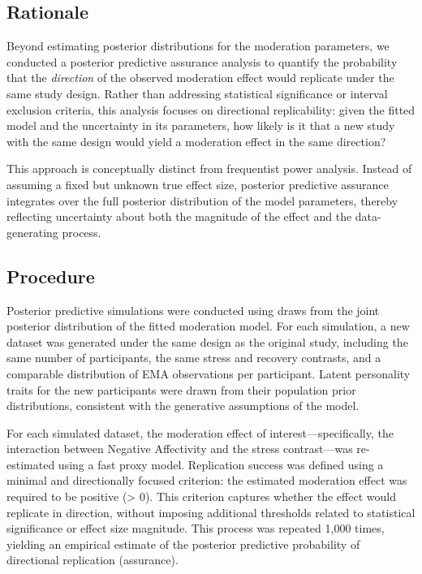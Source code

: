 \documentclass[
  english,
  man,floatsintext]{apa6}
\begin{document}
\subsection{Rationale}\label{rationale}

Beyond estimating posterior distributions for the moderation parameters, we conducted a posterior predictive assurance analysis to quantify the probability that the \emph{direction} of the observed moderation effect would replicate under the same study design. Rather than addressing statistical significance or interval exclusion criteria, this analysis focuses on directional replicability: given the fitted model and the uncertainty in its parameters, how likely is it that a new study with the same design would yield a moderation effect in the same direction?

This approach is conceptually distinct from frequentist power analysis. Instead of assuming a fixed but unknown true effect size, posterior predictive assurance integrates over the full posterior distribution of the model parameters, thereby reflecting uncertainty about both the magnitude of the effect and the data-generating process.

\subsection{Procedure}\label{procedure}

Posterior predictive simulations were conducted using draws from the joint posterior distribution of the fitted moderation model. For each simulation, a new dataset was generated under the same design as the original study, including the same number of participants, the same stress and recovery contrasts, and a comparable distribution of EMA observations per participant. Latent personality traits for the new participants were drawn from their population prior distributions, consistent with the generative assumptions of the model.

For each simulated dataset, the moderation effect of interest---specifically, the interaction between Negative Affectivity and the stress contrast---was re-estimated using a fast proxy model. Replication success was defined using a minimal and directionally focused criterion: the estimated moderation effect was required to be positive (\textgreater{} 0). This criterion captures whether the effect would replicate in direction, without imposing additional thresholds related to statistical significance or effect size magnitude. This process was repeated 1,000 times, yielding an empirical estimate of the posterior predictive probability of directional replication (assurance).
\end{document}
